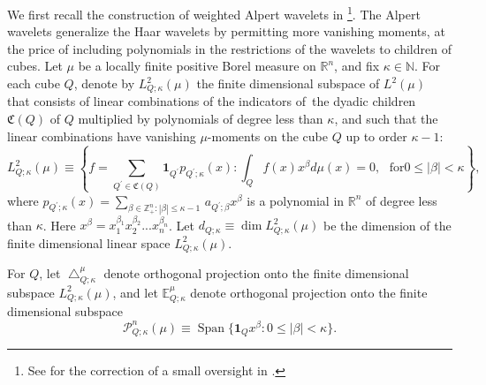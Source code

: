 \documentclass{amsart}%
\theoremstyle{plain}
\numberwithin{equation}{section}
\begin{document}
We first recall the construction of weighted Alpert wavelets in
\cite{RaSaWi}\footnote{See \cite{AlSaUr} for the correction of a small
oversight in \cite{RaSaWi}.}. The Alpert wavelets generalize the Haar wavelets
by permitting more vanishing moments, at the price of including polynomials in
the restrictions of the wavelets to children of cubes. Let $\mu$ be a locally
finite positive Borel measure on $\mathbb{R}^{n}$, and fix $\kappa
\in\mathbb{N}$. For each cube $Q$, denote by $L_{Q;\kappa}^{2}\left(
\mu\right)  $ the finite dimensional subspace of $L^{2}\left(  \mu\right)  $
that consists of linear combinations of the indicators of\ the dyadic children
$\mathfrak{C}\left(  Q\right)  $ of $Q$ multiplied by polynomials of degree
less than $\kappa$, and such that the linear combinations have vanishing $\mu
$-moments on the cube $Q$ up to order $\kappa-1$:%
\[
L_{Q;\kappa}^{2}\left(  \mu\right)  \equiv\left\{  f=%
{\displaystyle\sum\limits_{Q^{\prime}\in\mathfrak{C}\left(  Q\right)  }}
\mathbf{1}_{Q^{\prime}}p_{Q^{\prime};\kappa}\left(  x\right)  :\int
_{Q}f\left(  x\right)  x^{\beta}d\mu\left(  x\right)  =0,\ \ \ \text{for
}0\leq\left\vert \beta\right\vert <\kappa\right\}  ,
\]
where $p_{Q^{\prime};\kappa}\left(  x\right)  =\sum_{\beta\in\mathbb{Z}%
_{+}^{n}:\left\vert \beta\right\vert \leq\kappa-1\ }a_{Q^{\prime};\beta
}x^{\beta}$ is a polynomial in $\mathbb{R}^{n}$ of degree less than $\kappa$.
Here $x^{\beta}=x_{1}^{\beta_{1}}x_{2}^{\beta_{2}}...x_{n}^{\beta_{n}}$. Let
$d_{Q;\kappa}\equiv\dim L_{Q;\kappa}^{2}\left(  \mu\right)  $ be the dimension
of the finite dimensional linear space $L_{Q;\kappa}^{2}\left(  \mu\right)  $.

For $Q$, let
$\bigtriangleup_{Q;\kappa}^{\mu}$ denote orthogonal projection onto the finite
dimensional subspace $L_{Q;\kappa}^{2}\left(  \mu\right)  $, and let
$\mathbb{E}_{Q;\kappa}^{\mu}$ denote orthogonal projection onto the finite
dimensional subspace%
\[
\mathcal{P}_{Q;\kappa}^{n}\left(  \mu\right)  \equiv
\mathrm{\operatorname*{Span}}\{\mathbf{1}_{Q}x^{\beta}:0\leq\left\vert
\beta\right\vert <\kappa\}.
\]
\end{document}
